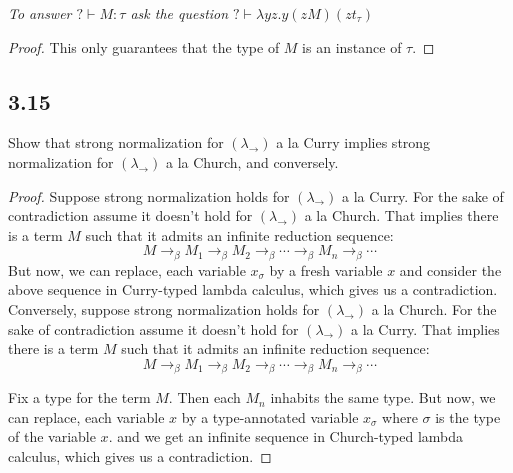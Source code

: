 \documentclass[12pt]{article}
\begin{document}
\textsl{To answer $? \vdash M : \tau$ ask the question $? \vdash \lambda yz.y(zM)(zt_\tau)$} \\

\begin{proof}
This only guarantees that the type of $M$ is an instance of $\tau$.
\end{proof}

\subsection*{3.15}
Show that strong normalization for $(\lambda_\rightarrow)$ a la Curry implies strong normalization for $(\lambda_\rightarrow)$ a la Church, and conversely. \\

\begin{proof}
Suppose strong normalization holds for $(\lambda_{\rightarrow})$ a la Curry. For the sake of contradiction assume it doesn't hold for $(\lambda_{\rightarrow})$ a la Church. That implies there is a term $M$ such that it admits an infinite reduction sequence:
$$M \rightarrow_\beta M_1 \rightarrow_\beta M_2 \rightarrow_\beta \cdots \rightarrow_\beta M_n \rightarrow_\beta \cdots$$
But now, we can replace, each variable $x_\sigma$ by a fresh variable $x$ and consider the above sequence in Curry-typed lambda calculus, which gives us a contradiction. \\

Conversely, suppose strong normalization holds for $(\lambda_{\rightarrow})$ a la Church. For the sake of contradiction assume it doesn't hold for $(\lambda_{\rightarrow})$ a la Curry. That implies there is a term $M$ such that it admits an infinite reduction sequence:
$$M \rightarrow_\beta M_1 \rightarrow_\beta M_2 \rightarrow_\beta \cdots \rightarrow_\beta M_n \rightarrow_\beta \cdots$$

Fix a type for the term $M$. Then each $M_n$ inhabits the same type. But now, we can replace, each variable $x$ by a type-annotated variable $x_\sigma$ where $\sigma$ is the type of the variable $x$. and we get an infinite sequence in Church-typed lambda calculus, which gives us a contradiction.
\end{proof}

\vspace{1in} %
\end{document}
